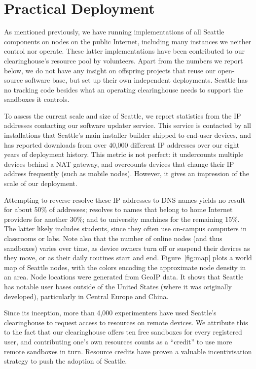 \section{Practical Deployment}\label{sec-deployment}

As mentioned previously, we have running implementations of all
Seattle components on nodes on the public Internet, including
many instances we neither control nor operate. These latter
implementations have been
contributed to our clearinghouse's resource pool by volunteers.
Apart from the numbers we report below, we do not have any
insight on offspring projects that reuse our open-source software
base, but set up their own independent deployments.
Seattle has no tracking code besides what an operating clearinghouse
needs to support the sandboxes it controls.

To assess the current scale and size of Seattle, we report
statistics from the \gls{IP} addresses contacting our software
updater service. This service is contacted
by all installations that Seattle's main installer builder shipped
to end-user devices, and has reported downloads from over 40,000
different \gls{IP} addresses over our eight years of deployment history.
This metric is not perfect: it undercounts multiple devices behind
a \gls{NAT} gateway, and overcounts devices that change their
\gls{IP} address frequently (such as mobile nodes). However, it
gives an impression of the scale of our deployment.

Attempting to reverse-resolve these \gls{IP} addresses to \gls{DNS}
names yields no result for about 50\% of addresses; resolves to
names that belong to home Internet providers for another 30\%; and to university
machines for the remaining 15\%. The latter likely includes students, since they
often use on-campus computers in classrooms or labs. Note also that the number
of online nodes (and thus sandboxes) varies over time, as device owners
turn off or suspend their devices as they move, or as their daily
routines start and end.
Figure~\ref{fig:map} plots a world map of Seattle nodes, with the
colors encoding the approximate node density in an area.
Node locations were generated from GeoIP data.
It shows that Seattle has notable user bases outside of the
United States (where it was originally developed),
particularly in Central Europe and China.

Since its inception,
more than 4,000 experimenters have used Seattle's clearinghouse
to request access to resources on remote devices. We attribute this
to the fact that our clearinghouse offers ten free sandboxes for
every registered user, and contributing one's own resources counts
as a ``credit'' to use more remote sandboxes in turn.
Resource credits have proven a valuable incentivisation strategy
to push the adoption of Seattle.

